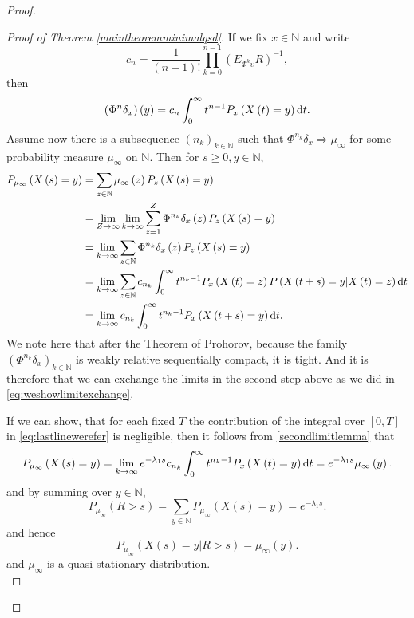 \documentclass[12pt,a4paper]{scrartcl}
\numberwithin{equation}{section}
\newcommand{\N}{\mathbb{N}} %
\begin{document}
\begin{proof}
\begin{proof}[Proof of Theorem \ref{maintheoremminimalqsd}]
If we fix $x \in \N$ and write
$$c_n = \frac{1}{\left(n-1\right)!} \prod_{k=0}^{n-1} \left(E_{\Phi^k\upsilon} R\right)^{-1},$$
then
$$\left(\Phi^n\delta_x\right)\left(y\right) = c_n \int_0^{\infty} t^{n-1} P_x\left( X\left(t\right)=y \right) \textnormal{d}t. $$
Assume now there is a subsequence $\left(n_k\right)_{k \in \N}$ such that $\Phi^{n_k}\delta_x \Rightarrow \mu_{\infty}$ for some probability measure $\mu_{\infty}$ on $\N.$ Then for $s \geq 0, y \in \N,$
\begin{align}
P_{\mu_{\infty}}\left(X\left(s\right) = y\right) &= \sum_{z \in \N} \mu_{\infty}\left(z\right) P_z\left(X\left(s\right) = y\right)  \nonumber \\
&=\lim_{Z \to \infty} \lim_{k \to \infty} \sum_{z=1}^Z \Phi^{n_k}\delta_x\left(z\right) P_z\left(X\left(s\right) = y\right) \nonumber \\ 
&=\lim_{k \to \infty} \sum_{z \in \N} \Phi^{n_k}\delta_x\left(z\right) P_z\left(X\left(s\right) = y\right) \nonumber\\ 
&=\lim_{k \to \infty} \sum_{z \in \N} c_{n_k} \int_0^{\infty} t^{n_k-1} P_x\left(X\left(t\right) = z\right) P\left(X\left(t+s\right)=y | X\left(t\right) = z\right) \textnormal{d} t \nonumber \\ 
&=\lim_{k \to \infty} c_{n_k} \int_0^{\infty} t^{n_k-1} P_x\left(X\left(t+s\right) = y\right) \textnormal{d}t. \label{eq:lastlinewerefer}
\end{align}
We note here that after the Theorem of Prohorov, because the family $\left(\Phi^{n_k}\delta_x \right)_{k \in \N}$ is weakly relative sequentially compact, it is tight. And it is therefore that we can exchange the limits in the second step above as we did in \eqref{eq:weshowlimitexchange}.

If we can show, that for each fixed $T$ the contribution of the integral over $\left[0,T\right]$ in \eqref{eq:lastlinewerefer} is negligible, then it follows from \eqref{secondlimitlemma} that 
$$P_{\mu_{\infty}}\left(X\left(s\right) = y \right) = \lim_{k \to \infty} e^{-\lambda_1 s} c_{n_k} \int_0^{\infty} t^{n_k-1} P_x\left(X\left(t\right) = y\right) \textnormal{d}t = e^{-\lambda_1 s} \mu_{\infty}\left(y\right).$$
and by summing over $y \in \N$,
\begin{equation} \label{eq:fromhereitismqsd}
P_{\mu_{\infty}}\left(R > s \right) = \sum_{y \in \N} P_{\mu_{\infty}}\left(X\left(s\right) = y \right) = e^{-\lambda_1 s}.
\end{equation}
and hence
$$P_{\mu_{\infty}}\left(X\left(s\right) = y | R > s \right) = \mu_{\infty}\left(y\right).$$
and $\mu_{\infty}$ is a quasi-stationary distribution.\\[2ex]


\end{proof}
\end{proof}
\end{document}
